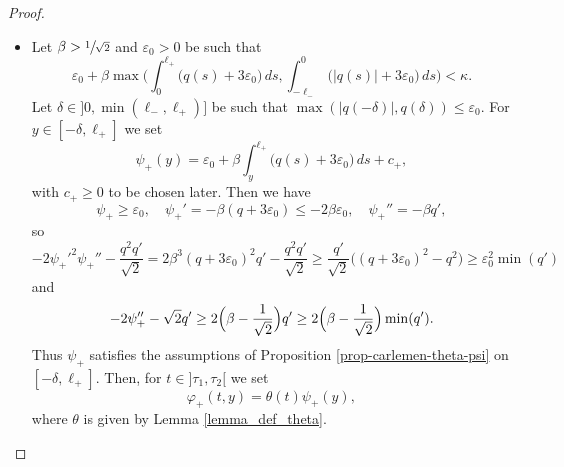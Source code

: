 \documentclass[11pt]{article}
\newcommand{\skpt}{\smallskip}
\numberwithin{equation}{section}
\theoremstyle{plain}
\theoremstyle{definition}
\newcommand{\abs}[1]{\vert #1\vert}
\newcommand{\1}{\mathds 1}
\let\d\delta
\let\e\varepsilon
\let\th\theta
\let\k\kappa
\let\f\varphi
\begin{document}
\skpt
\begin{proof}
\begin{itemize}
\item
Let $\beta > \sfrac 1 {\sqrt 2}$ and $\e_0 > 0$ be such that
\begin{equation} \label{eq-eps-kappa}
\e_0 + \beta \max\biggl(\int_{0}^{\ell_+} \bigl(q(s) + 3 \e_0 \bigr) \, ds, \int_{-\ell_-}^0 \bigl(\abs{q(s)} + 3 \e_0 \bigr) \,ds \biggr) < \k.
\end{equation}
Let $\d \in{}]0,\min(\ell_-,\ell_+)]$ be such that $\max(\abs{q(-\delta)},q(\delta)) \leq \e_0$. For $y \in [-\d,\ell_+]$ we set
\[
\psi_+(y) = \e_0 + \beta \int_{y}^{\ell_+} \bigl(q(s)+3\e_0 \bigr) \, ds + c_+,
\]
with $c_+ \geq 0$ to be chosen later.
Then we have
\[
\psi_+ \geq \e_0, \quad \psi_+' = -\beta (q + 3 \e_0) \leq - 2 \beta \e_0, \quad \psi_+'' = - \beta q',
\]
so
\[
- 2 \psi_+'^2 \psi_+'' - \frac {q^2 q'}{\sqrt 2}
 = 2 \beta^3 (q+3\e_0)^2 q' - \frac {q^2 q'}{\sqrt 2}\geq \frac {q'}{\sqrt 2} \bigl((q+3\e_0)^2 - q^2 \bigr)\geq \e_0^2 \min(q')
\]
and
\[
- 2 \psi_+'' - \sqrt 2 q' \geq 2 \Bigl(\beta - \frac{1}{\sqrt 2}\Bigr) q' \geq 2 \Bigl(\beta - \frac{1}{\sqrt 2}\Bigr) \min(q').
\]
Thus $\psi_+$ satisfies the assumptions of Proposition \ref{prop-carlemen-theta-psi} on $[-\d,\ell_+]$.
Then, for $t \in{}]\tau_1,\tau_2[$ we set
\begin{equation} \label{def-phi-+}
\f_+(t,y) = \th(t) \psi_+(y),
\end{equation}
where $\th$ is given by Lemma \ref{lemma_def_theta}.


\end{itemize}
\end{proof}
\end{document}
